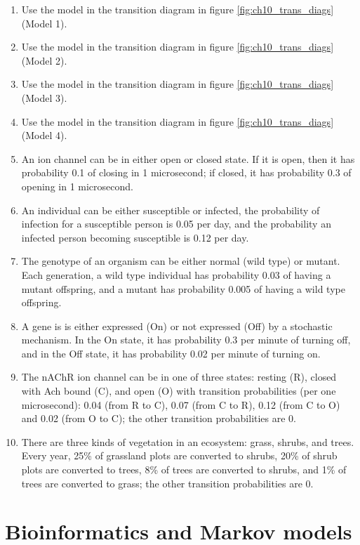 \documentclass[
  letterpaper,
  DIV=11,
  numbers=noendperiod]{scrreprt}
\begin{document}
\begin{enumerate}
\def\labelenumi{\arabic{enumi}.}
\item
  Use the model in the transition diagram in figure
  \ref{fig:ch10_trans_diags} (Model 1).
\item
  Use the model in the transition diagram in figure
  \ref{fig:ch10_trans_diags} (Model 2).
\item
  Use the model in the transition diagram in figure
  \ref{fig:ch10_trans_diags} (Model 3).
\item
  Use the model in the transition diagram in figure
  \ref{fig:ch10_trans_diags} (Model 4).
\item
  An ion channel can be in either open or closed state. If it is open,
  then it has probability 0.1 of closing in 1 microsecond; if closed, it
  has probability 0.3 of opening in 1 microsecond.
\item
  An individual can be either susceptible or infected, the probability
  of infection for a susceptible person is 0.05 per day, and the
  probability an infected person becoming susceptible is 0.12 per day.
\item
  The genotype of an organism can be either normal (wild type) or
  mutant. Each generation, a wild type individual has probability 0.03
  of having a mutant offspring, and a mutant has probability 0.005 of
  having a wild type offspring.
\item
  A gene is is either expressed (On) or not expressed (Off) by a
  stochastic mechanism. In the On state, it has probability 0.3 per
  minute of turning off, and in the Off state, it has probability 0.02
  per minute of turning on.
\item
  The nAChR ion channel can be in one of three states: resting (R),
  closed with Ach bound (C), and open (O) with transition probabilities
  (per one microsecond): 0.04 (from R to C), 0.07 (from C to R), 0.12
  (from C to O) and 0.02 (from O to C); the other transition
  probabilities are 0.
\item
  There are three kinds of vegetation in an ecosystem: grass, shrubs,
  and trees. Every year, 25\% of grassland plots are converted to
  shrubs, 20\% of shrub plots are converted to trees, 8\% of trees are
  converted to shrubs, and 1\% of trees are converted to grass; the
  other transition probabilities are 0.
\end{enumerate}

\hypertarget{bioinformatics-and-markov-models}{%
\section{Bioinformatics and Markov
models}\label{bioinformatics-and-markov-models}}
\end{document}
